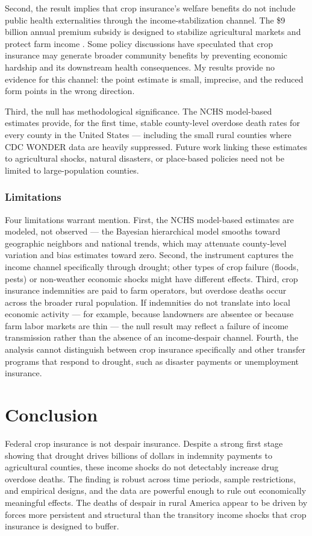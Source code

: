 \documentclass[12pt]{article}
\begin{document}
Second, the result implies that crop insurance's welfare benefits do not include public health externalities through the income-stabilization channel. The \$9 billion annual premium subsidy is designed to stabilize agricultural markets and protect farm income \citep{glauber2013growth}. Some policy discussions have speculated that crop insurance may generate broader community benefits by preventing economic hardship and its downstream health consequences. My results provide no evidence for this channel: the point estimate is small, imprecise, and the reduced form points in the wrong direction.

Third, the null has methodological significance. The NCHS model-based estimates provide, for the first time, stable county-level overdose death rates for every county in the United States --- including the small rural counties where CDC WONDER data are heavily suppressed. Future work linking these estimates to agricultural shocks, natural disasters, or place-based policies need not be limited to large-population counties.

\subsubsection*{Limitations} Four limitations warrant mention. First, the NCHS model-based estimates are modeled, not observed --- the Bayesian hierarchical model smooths toward geographic neighbors and national trends, which may attenuate county-level variation and bias estimates toward zero. Second, the instrument captures the income channel specifically through drought; other types of crop failure (floods, pests) or non-weather economic shocks might have different effects. Third, crop insurance indemnities are paid to farm operators, but overdose deaths occur across the broader rural population. If indemnities do not translate into local economic activity --- for example, because landowners are absentee or because farm labor markets are thin --- the null result may reflect a failure of income transmission rather than the absence of an income-despair channel. Fourth, the analysis cannot distinguish between crop insurance specifically and other transfer programs that respond to drought, such as disaster payments or unemployment insurance.

\section{Conclusion}

Federal crop insurance is not despair insurance. Despite a strong first stage showing that drought drives billions of dollars in indemnity payments to agricultural counties, these income shocks do not detectably increase drug overdose deaths. The finding is robust across time periods, sample restrictions, and empirical designs, and the data are powerful enough to rule out economically meaningful effects. The deaths of despair in rural America appear to be driven by forces more persistent and structural than the transitory income shocks that crop insurance is designed to buffer.
\end{document}

